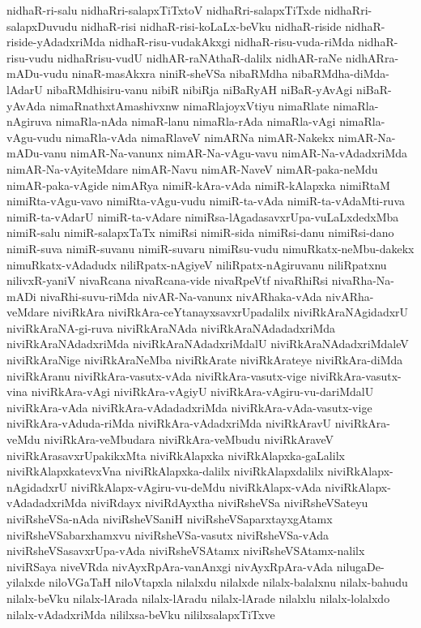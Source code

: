 {nidhaR-ri-salu
nidhaRri-salapxTiTxtoV
nidhaRri-salapxTiTxde
nidhaRri-salapxDuvudu
nidhaR-risi
nidhaR-risi-koLaLx-beVku
nidhaR-riside
nidhaR-riside-yAdadxriMda
nidhaR-risu-vudakAkxgi
nidhaR-risu-vuda-riMda
nidhaR-risu-vudu
nidhaRrisu-vudU
nidhAR-raNAthaR-dalilx
nidhAR-raNe
nidhARra-mADu-vudu
ninaR-masAkxra
niniR-sheVSa
nibaRMdha
nibaRMdha-diMda-lAdarU
nibaRMdhisiru-vanu
nibiR
nibiRja
niBaRyAH
niBaR-yAvAgi
niBaR-yAvAda
nimaRnathxtAmashivxnw
nimaRlajoyxVtiyu
nimaRlate
nimaRla-nAgiruva
nimaRla-nAda
nimaR-lanu
nimaRla-rAda
nimaRla-vAgi
nimaRla-vAgu-vudu
nimaRla-vAda
nimaRlaveV
nimARNa
nimAR-Nakekx
nimAR-Na-mADu-vanu
nimAR-Na-vanunx
nimAR-Na-vAgu-vavu
nimAR-Na-vAdadxriMda
nimAR-Na-vAyiteMdare
nimAR-Navu
nimAR-NaveV
nimAR-paka-neMdu
nimAR-paka-vAgide
nimARya
nimiR-kAra-vAda
nimiR-kAlapxka
nimiRtaM
nimiRta-vAgu-vavo
nimiRta-vAgu-vudu
nimiR-ta-vAda
nimiR-ta-vAdaMti-ruva
nimiR-ta-vAdarU
nimiR-ta-vAdare
nimiRsa-lAgadasavxrUpa-vuLaLxdedxMba
nimiR-salu
nimiR-salapxTaTx
nimiRsi
nimiR-sida
nimiRsi-danu
nimiRsi-dano
nimiR-suva
nimiR-suvanu
nimiR-suvaru
nimiRsu-vudu
nimuRkatx-neMbu-dakekx
nimuRkatx-vAdadudx
niliRpatx-nAgiyeV
niliRpatx-nAgiruvanu
niliRpatxnu
nilivxR-yaniV
nivaRcana
nivaRcana-vide
nivaRpeVtf
nivaRhiRsi
nivaRha-Na-mADi
nivaRhi-suvu-riMda
nivAR-Na-vanunx
nivARhaka-vAda
nivARha-veMdare
niviRkAra
niviRkAra-ceYtanayxsavxrUpadalilx
niviRkAraNAgidadxrU
niviRkAraNA-gi-ruva
niviRkAraNAda
niviRkAraNAdadadxriMda
niviRkAraNAdadxriMda
niviRkAraNAdadxriMdalU
niviRkAraNAdadxriMdaleV
niviRkAraNige
niviRkAraNeMba
niviRkArate
niviRkArateye
niviRkAra-diMda
niviRkAranu
niviRkAra-vasutx-vAda
niviRkAra-vasutx-vige
niviRkAra-vasutx-vina
niviRkAra-vAgi
niviRkAra-vAgiyU
niviRkAra-vAgiru-vu-dariMdalU
niviRkAra-vAda
niviRkAra-vAdadadxriMda
niviRkAra-vAda-vasutx-vige
niviRkAra-vAduda-riMda
niviRkAra-vAdadxriMda
niviRkAravU
niviRkAra-veMdu
niviRkAra-veMbudara
niviRkAra-veMbudu
niviRkAraveV
niviRkArasavxrUpakikxMta
niviRkAlapxka
niviRkAlapxka-gaLalilx
niviRkAlapxkatevxVna
niviRkAlapxka-dalilx
niviRkAlapxdalilx
niviRkAlapx-nAgidadxrU
niviRkAlapx-vAgiru-vu-deMdu
niviRkAlapx-vAda
niviRkAlapx-vAdadadxriMda
niviRdayx
niviRdAyxtha
niviRsheVSa
niviRsheVSateyu
niviRsheVSa-nAda
niviRsheVSaniH
niviRsheVSaparxtayxgAtamx
niviRsheVSabarxhamxvu
niviRsheVSa-vasutx
niviRsheVSa-vAda
niviRsheVSasavxrUpa-vAda
niviRsheVSAtamx
niviRsheVSAtamx-nalilx
niviRSaya
niveVRda
nivAyxRpAra-vanAnxgi
nivAyxRpAra-vAda
nilugaDe-yilalxde
niloVGaTaH
niloVtapxla
nilalxdu
nilalxde
nilalx-balalxnu
nilalx-bahudu
nilalx-beVku
nilalx-lArada
nilalx-lAradu
nilalx-lArade
nilalxlu
nilalx-lolalxdo
nilalx-vAdadxriMda
nililxsa-beVku
nililxsalapxTiTxve
}
